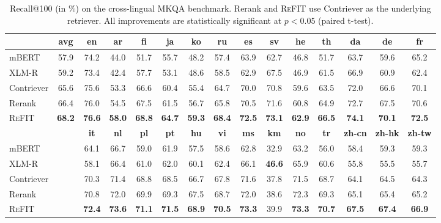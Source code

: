 \begin{table}[t]
    \centering
    \scriptsize
    \setlength{\tabcolsep}{0.7em}
    \def\arraystretch{1.3}
    \begin{tabular}{lcccccccccccccc}
    \hline
    & \textbf{avg} & \textbf{en} & \textbf{ar} & \textbf{fi} & \textbf{ja} & \textbf{ko} & \textbf{ru} & \textbf{es} & \textbf{sv} & \textbf{he} & \textbf{th} & \textbf{da} & \textbf{de} & \textbf{fr}\\ 
    \hline
    mBERT & 57.9 &74.2 & 44.0 & 51.7 & 55.7 &48.2 &57.4 &63.9 & 62.7 & 46.8 & 51.7 & 63.7 & 59.6 & 65.2\\
    XLM-R & 59.2 & 73.4 & 42.4 & 57.7& 53.1 &48.6 &58.5 &62.9 &67.5 &46.9 &61.5 &66.9 &60.9 &62.4\\
    \hdashline
    Contriever& 65.6 & 75.6 & 53.3 & 66.6 &60.4 &55.4 &64.7 &70.0 &70.8 &59.6 &63.5 &72.0 &66.6 &70.1\\
    Rerank & 66.4 & 76.0 & 54.5 & 67.5 & 61.5 & 56.7 & 65.8 & 70.5 & 71.6 & 60.8 & 64.9 & 72.7 & 67.5 & 70.6\\
    \textsc{ReFIT} & \textbf{68.2} & \textbf{76.6} & \textbf{58.0} & \textbf{68.8} & \textbf{64.7} & \textbf{59.3} & \textbf{68.4} & \textbf{72.5} & \textbf{73.1} & \textbf{62.9} & \textbf{66.5} & \textbf{74.1} & \textbf{70.1} & \textbf{72.5}\\
    \hline
    \hline
    &  & \textbf{it} & \textbf{nl} & \textbf{pl} & \textbf{pt} & \textbf{hu} & \textbf{vi} & \textbf{ms} & \textbf{km} & \textbf{no} & \textbf{tr} & \textbf{zh-cn} & \textbf{zh-hk} & \textbf{zh-tw} \\ 
    \hline
   mBERT & & 64.1 & 66.7 & 59.0 & 61.9 & 57.5 & 58.6 & 62.8 & 32.9 & 63.2 & 56.0 & 58.4 & 59.3 & 59.3\\
    XLM-R & & 58.1 & 66.4 & 61.0 & 62.0 & 60.1 & 62.4 & 66.1 & \textbf{46.6} & 65.9 & 60.6 & 55.8 & 55.5 & 55.7\\
    \hdashline
    Contriever & & 70.3 &71.4 &68.8 &68.5 &66.7 &67.8 &71.6 &37.8 &71.5 &68.7 &64.1 &64.5 &64.3 \\
    Rerank & & 70.8 & 72.0 & 69.9 & 69.3 & 67.5 & 68.7 & 72.0 & 38.6 & 72.3 & 69.3 & 65.1 & 65.4 & 65.2 \\
    \textsc{ReFIT} & & \textbf{72.4} & \textbf{73.6} & \textbf{71.1} & \textbf{71.5} & \textbf{68.9} & \textbf{70.5} & \textbf{73.3} & 39.9 &\textbf{73.3} & \textbf{70.7} & \textbf{67.5} & \textbf{67.4} & \textbf{66.9} \\
    \hline
    \hline
    \end{tabular}
    \caption{Recall@100 (in \%) on the cross-lingual MKQA benchmark.  Rerank and \textsc{ReFIT} use Contriever as the underlying retriever. All improvements are statistically significant at $p < 0.05$ (paired t-test).}
    \label{tab:crossling_nums}
    \vspace{-0.5em}
\end{table}


